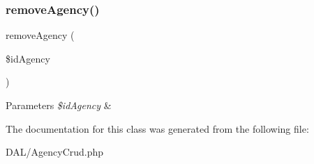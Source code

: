\subsubsection{\texorpdfstring{removeAgency()}{removeAgency()}}
{\footnotesize\ttfamily remove\+Agency (\begin{DoxyParamCaption}\item[{}]{\$id\+Agency }\end{DoxyParamCaption})}


\begin{DoxyParams}{Parameters}
{\em \$id\+Agency} & \\
\hline
\end{DoxyParams}


The documentation for this class was generated from the following file\+:\begin{DoxyCompactItemize}
\item 
D\+A\+L/Agency\+Crud.\+php\end{DoxyCompactItemize}
